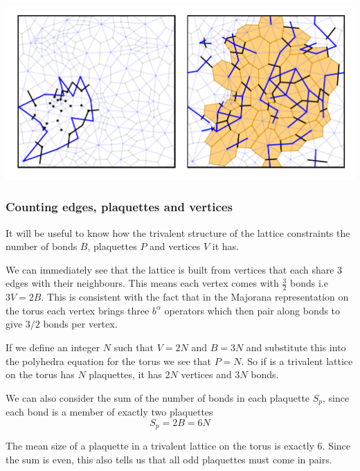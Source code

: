 \includegraphics[width=1\textwidth,height=\textheight]{figure_code/amk_chapter/flood_fill_amorphous/flood_fill_amorphous.pdf}

\hypertarget{counting-edges-plaquettes-and-vertices}{%
\subsubsection{Counting edges, plaquettes and vertices}\label{counting-edges-plaquettes-and-vertices}}

It will be useful to know how the trivalent structure of the lattice constraints the number of bonds \(B\), plaquettes \(P\) and vertices \(V\) it has.

We can immediately see that the lattice is built from vertices that each share 3 edges with their neighbours. This means each vertex comes with \(\tfrac{3}{2}\) bonds i.e \(3V = 2B\). This is consistent with the fact that in the Majorana representation on the torus each vertex brings three \(b^\alpha\) operators which then pair along bonds to give \(3/2\) bonds per vertex.

If we define an integer \(N\) such that \(V = 2N\) and \(B = 3N\) and substitute this into the polyhedra equation for the torus we see that \(P = N\). So if is a trivalent lattice on the torus has \(N\) plaquettes, it has \(2N\) vertices and \(3N\) bonds.

We can also consider the sum of the number of bonds in each plaquette \(S_p\), since each bond is a member of exactly two plaquettes \[S_p = 2B = 6N\]

The mean size of a plaquette in a trivalent lattice on the torus is exactly 6. Since the sum is even, this also tells us that all odd plaquettes must come in pairs.

